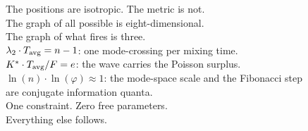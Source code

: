 \documentclass[12pt, a4paper]{article}
\begin{document}
\begin{center}
{The positions are isotropic. The metric is not.\\
The graph of all possible is eight-dimensional.\\
The graph of what fires is three.\\[4pt]
$\lambda_2\cdot T_{\rm avg}=n-1$: one mode-crossing per mixing time.\\
$K^*\cdot T_{\rm avg}/F=e$: the wave carries the Poisson surplus.\\
$\ln(n)\cdot\ln(\varphi)\approx 1$: the mode-space scale and the Fibonacci step\\
are conjugate information quanta.\\[4pt]
One constraint. Zero free parameters.\\
Everything else follows.}
\end{center}
\end{document}
